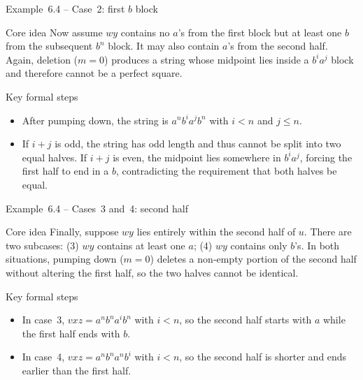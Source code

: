 \begin{frame}[t]{Example 6.4 – Case 2: first $b$ block}
  \begin{tblock}{Core idea}
    Now assume $w y$ contains no $a$’s from the first block but at
    least one $b$ from the subsequent $b^n$ block.  It may also
    contain $a$’s from the second half.  Again, deletion ($m=0$)
    produces a string whose midpoint lies inside a $b^i a^j$ block and
    therefore cannot be a perfect square.
  \end{tblock}
  \begin{tblock}{Key formal steps}
    \begin{itemize}
      \item After pumping down, the string is $a^n b^i a^j b^n$ with
        $i<n$ and $j\le n$.
      \item If $i+j$ is odd, the string has odd length and thus cannot
        be split into two equal halves.  If $i+j$ is even, the midpoint
        lies somewhere in $b^i a^j$, forcing the first half to end in a
        $b$, contradicting the requirement that both halves be equal.
    \end{itemize}
  \end{tblock}
  \label{fr:6.1-16}
\end{frame}

\begin{frame}[t]{Example 6.4 – Cases 3 and 4: second half}
  \begin{tblock}{Core idea}
    Finally, suppose $w y$ lies entirely within the second half of $u$.
    There are two subcases: (3) $w y$ contains at least one $a$; (4)
    $w y$ contains only $b$’s.  In both situations, pumping down
    ($m=0$) deletes a non‑empty portion of the second half without
    altering the first half, so the two halves cannot be identical.
  \end{tblock}
  \begin{tblock}{Key formal steps}
    \begin{itemize}
      \item In case 3, $v x z = a^n b^n a^i b^n$ with $i < n$, so the
        second half starts with $a$ while the first half ends with $b$.
      \item In case 4, $v x z = a^n b^n a^n b^i$ with $i < n$, so the
        second half is shorter and ends earlier than the first half.
    \end{itemize}
  \end{tblock}
  \label{fr:6.1-17}
\end{frame}


